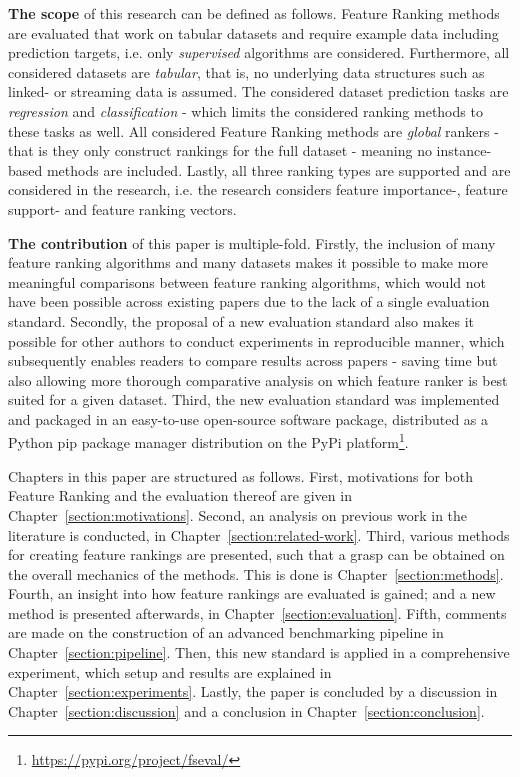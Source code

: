 \documentclass[../main.tex]{subfiles}
\begin{document}
\textbf{The scope} of this research can be defined as follows. Feature Ranking methods are evaluated that work on tabular datasets and require example data including prediction targets, i.e. only \textit{supervised} algorithms are considered. Furthermore, all considered datasets are \textit{tabular}, that is, no underlying data structures such as linked- or streaming data is assumed. The considered dataset prediction tasks are \textit{regression} and \textit{classification} - which limits the considered ranking methods to these tasks as well. All considered Feature Ranking methods are \textit{global} rankers - that is they only construct rankings for the full dataset - meaning no instance-based methods are included. Lastly, all three ranking types are supported and are considered in the research, i.e. the research considers feature importance-, feature support- and feature ranking vectors.



\textbf{The contribution} of this paper is multiple-fold. Firstly, the inclusion of many feature ranking algorithms and many datasets makes it possible to make more meaningful comparisons between feature ranking algorithms, which would not have been possible across existing papers due to the lack of a single evaluation standard. Secondly, the proposal of a new evaluation standard also makes it possible for other authors to conduct experiments in reproducible manner, which subsequently enables readers to compare results across papers - saving time but also allowing more thorough comparative analysis on which feature ranker is best suited for a given dataset. Third, the new evaluation standard was implemented and packaged in an easy-to-use open-source software package, distributed as a Python  pip package manager distribution on the PyPi platform\footnote{\href{https://pypi.org/project/fseval/}{https://pypi.org/project/fseval/}}.



Chapters in this paper are structured as follows. First, motivations for both Feature Ranking and the evaluation thereof are given in Chapter~\ref{section:motivations}. Second, an analysis on previous work in the literature is conducted, in Chapter~\ref{section:related-work}. Third, various methods for creating feature rankings are presented, such that a grasp can be obtained on the overall mechanics of the methods. This is done is Chapter~\ref{section:methods}. Fourth, an insight into how feature rankings are evaluated is gained; and a new method is presented afterwards, in Chapter~\ref{section:evaluation}. Fifth, comments are made on the construction of an advanced benchmarking pipeline in Chapter~\ref{section:pipeline}. Then, this new standard is applied in a comprehensive experiment, which setup and results are explained in Chapter~\ref{section:experiments}. Lastly, the paper is concluded by a discussion in Chapter~\ref{section:discussion} and a conclusion in Chapter~\ref{section:conclusion}.


\biblio
\end{document}
